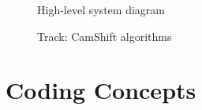 \begin{landscape}
    \begin{figure}[h!]
        \small\centering\vspace{-0.5cm}
        
        \caption{High-level system diagram}
    \end{figure}
    \begin{figure}\centering\vspace{-4.5cm}
        
        \caption{Track: CamShift algorithms}
        \label{fig:motionmodels}
    \end{figure}
\end{landscape}
\section{Coding Concepts}



\printbibliography\cleardoublepage


